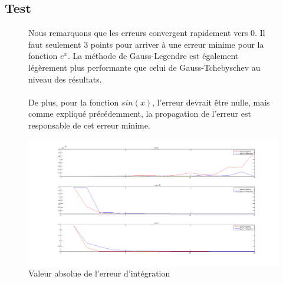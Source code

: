 \documentclass[a4paper,10pt]{report}
\begin{document}
\begin{center}
	
\end{center}

\subsection*{Test}

\begin{figure}[H]


	Nous remarquons que les erreurs convergent rapidement vers 0. Il faut seulement 3 points pour arriver à une erreur minime pour la fonction $e^{x}$. La méthode de Gauss-Legendre est également légèrement plus performante que celui de Gauss-Tchebyschev au niveau des résultats.
	\\
	\\
	De plus, pour la fonction $sin(x)$, l'erreur devrait être nulle, mais comme expliqué précédemment, la propagation de l'erreur est responsable de cet erreur minime.
	\begin{center}
		\includegraphics[scale=0.35]{error_gauss}
		\caption{Valeur absolue de l'erreur d'intégration}
	\end{center}
\end{figure}
\end{document}
